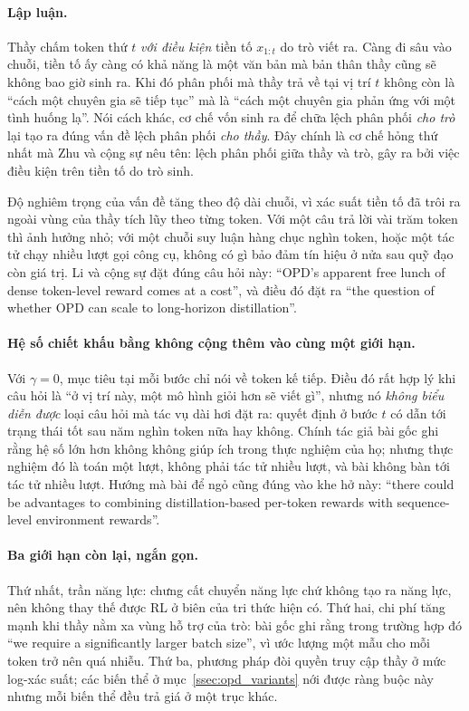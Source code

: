 \paragraph{Lập luận.} Thầy chấm token thứ $t$ \emph{với điều kiện} tiền tố $x_{1:t}$ do trò viết ra. Càng đi sâu vào chuỗi, tiền tố ấy càng có khả năng là một văn bản mà bản thân thầy cũng sẽ không bao giờ sinh ra. Khi đó phân phối mà thầy trả về tại vị trí $t$ không còn là ``cách một chuyên gia sẽ tiếp tục'' mà là ``cách một chuyên gia phản ứng với một tình huống lạ''. Nói cách khác, cơ chế vốn sinh ra để chữa lệch phân phối \emph{cho trò} lại tạo ra đúng vấn đề lệch phân phối \emph{cho thầy}. Đây chính là cơ chế hỏng thứ nhất mà Zhu và cộng sự \cite{zhu2026manyfaces} nêu tên: lệch phân phối giữa thầy và trò, gây ra bởi việc điều kiện trên tiền tố do trò sinh.

Độ nghiêm trọng của vấn đề tăng theo độ dài chuỗi, vì xác suất tiền tố đã trôi ra ngoài vùng của thầy tích lũy theo từng token. Với một câu trả lời vài trăm token thì ảnh hưởng nhỏ; với một chuỗi suy luận hàng chục nghìn token, hoặc một tác tử chạy nhiều lượt gọi công cụ, không có gì bảo đảm tín hiệu ở nửa sau quỹ đạo còn giá trị. Li và cộng sự \cite{li2026rethinkingopd} đặt đúng câu hỏi này: ``OPD's apparent free lunch of dense token-level reward comes at a cost'', và điều đó đặt ra ``the question of whether OPD can scale to long-horizon distillation''.

\paragraph{Hệ số chiết khấu bằng không cộng thêm vào cùng một giới hạn.} Với $\gamma = 0$, mục tiêu tại mỗi bước chỉ nói về token kế tiếp. Điều đó rất hợp lý khi câu hỏi là ``ở vị trí này, một mô hình giỏi hơn sẽ viết gì'', nhưng nó \emph{không biểu diễn được} loại câu hỏi mà tác vụ dài hơi đặt ra: quyết định ở bước $t$ có dẫn tới trạng thái tốt sau năm nghìn token nữa hay không. Chính tác giả bài gốc ghi rằng hệ số lớn hơn không không giúp ích trong thực nghiệm của họ; nhưng thực nghiệm đó là toán một lượt, không phải tác tử nhiều lượt, và bài không bàn tới tác tử nhiều lượt. Hướng mà bài để ngỏ cũng đúng vào khe hở này: ``there could be advantages to combining distillation-based per-token rewards with sequence-level environment rewards''.

\paragraph{Ba giới hạn còn lại, ngắn gọn.} Thứ nhất, trần năng lực: chưng cất chuyển năng lực chứ không tạo ra năng lực, nên không thay thế được RL ở biên của tri thức hiện có. Thứ hai, chi phí tăng mạnh khi thầy nằm xa vùng hỗ trợ của trò: bài gốc ghi rằng trong trường hợp đó ``we require a significantly larger batch size'', vì ước lượng một mẫu cho mỗi token trở nên quá nhiễu. Thứ ba, phương pháp đòi quyền truy cập thầy ở mức log-xác suất; các biến thể ở mục~\ref{ssec:opd_variants} nới được ràng buộc này nhưng mỗi biến thể đều trả giá ở một trục khác.

